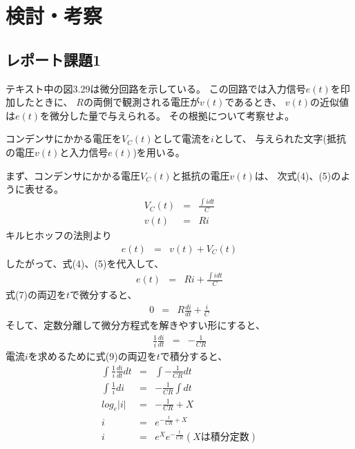 \documentclass[12pt]{jarticle}
\begin{document}
\section{検討・考察}

\subsection{レポート課題1}
\begin{shadebox}
    テキスト中の図3.29は微分回路を示している。
    この回路では入力信号$e(t)$を印加したときに、
    $R$の両側で観測される電圧が$v(t)$であるとき、
    $v(t)$の近似値は$e(t)$を微分した量で与えられる。
    その根拠について考察せよ。
\end{shadebox}
コンデンサにかかる電圧を$V_C(t)$として電流を$i$として、
与えられた文字(抵抗の電圧$v(t)$と入力信号$e(t)$)を用いる。

まず、コンデンサにかかる電圧$V_C(t)$と抵抗の電圧$v(t)$は、
次式(4)、(5)のように表せる。
\begin{eqnarray}
    V_C(t)&=&\frac{\int idt}{C}\\
    v(t)&=&Ri
\end{eqnarray}
キルヒホッフの法則より
\begin{eqnarray}
    e(t)&=&v(t)+V_C(t)
\end{eqnarray}
したがって、式(4)、(5)を代入して、
\begin{eqnarray}
    e(t)&=&Ri+\frac{\int idt}{C}
\end{eqnarray}
式(7)の両辺を$t$で微分すると、
\begin{eqnarray}
    0&=&R\frac{di}{dt}+\frac{i}{C}
\end{eqnarray}
そして、定数分離して微分方程式を解きやすい形にすると、
\begin{eqnarray}
    \frac{1}{i}\frac{di}{dt}&=&-\frac{1}{CR}
\end{eqnarray}
電流$i$を求めるために式(9)の両辺を$t$で積分すると、
\begin{eqnarray}
    \int \frac{1}{i} \frac{di}{dt}dt&=&\int-\frac{1}{CR}dt \nonumber\\
    \int \frac{1}{i}di&=&-\frac{1}{CR}\int dt \nonumber\\
    log_e|i|&=&-\frac{1}{CR}+X \nonumber\\
    i&=&e^{-\frac{t}{CR}+X} \nonumber\\
    i&=&e^Xe^{-\frac{t}{CR}}(Xは積分定数)
\end{eqnarray}
\clearpage
\end{document}
